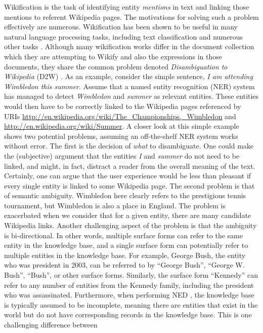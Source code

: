 
Wikification is the task of identifying entity \emph{mentions} in text and linking those mentions to referent Wikipedia pages. The motivations for solving such a problem effectively are numerous. Wikification has been shown to be useful in many natural language processing tasks, including text classification \cite{use1} and numerous other tasks \cite{kulkarni}. Although many wikification works differ in the document collection which they are attempting to Wikify and also the expressions in those documents, they share the common problem denoted \emph{Disambiguation to Wikipedia} (D2W) \cite{roth}. As an example, consider the simple sentence, \emph{I am attending Wimbledon this summer}. Assume that a named entity recognition (NER) \cite{ner} system has managed to detect \emph{Wimbledon} and \emph{summer} as relevant entities. These entities would then have to be correctly linked to the Wikipedia pages referenced by URIs \url{http://en.wikipedia.org/wiki/The_Championships,_Wimbledon} and \url{http://en.wikipedia.org/wiki/Summer}. A closer look at this simple example shows two potential problems, assuming an off-the-shelf NER system works without error. The first is the decision of \emph{what} to disambiguate. One could make the (subjective) argument that the entities \emph{I} and \emph{summer} do not need to be linked, and might, in fact, distract a reader from the overall meaning of the text. Certainly, one can argue that the user experience would be less than pleasant if every single entity is linked to some Wikipedia page. The second problem is that of semantic ambiguity. Wimbledon here clearly refers to the prestigious tennis tournament, but Wimbledon is also a place in England. The problem is exacerbated when we consider that for a given entity, there are many candidate Wikipedia links. 
Another challenging aspect of the problem is that the ambiguity is bi-directional. 
In other words,
multiple surface forms can refer to the same entity in the knowledge base, and a single
surface form can potentially refer to multiple entities in the knowledge base. 
For example,
George Bush, the entity who was president in 2003, can be referred to by ``George Bush'',
``George W. Bush'', ``Bush'', or other surface forms. Similarly, the surface 
form ``Kennedy''
can refer to any number of entities from the Kennedy family, including the president 
who was
assassinated.
Furthermore, when performing NED \cite{cucerzan}, the knowledge base is
typically assumed to be incomplete, meaning there are entities that exist in the world but do 
not have corresponding records in the knowledge base. This is one challenging difference between
